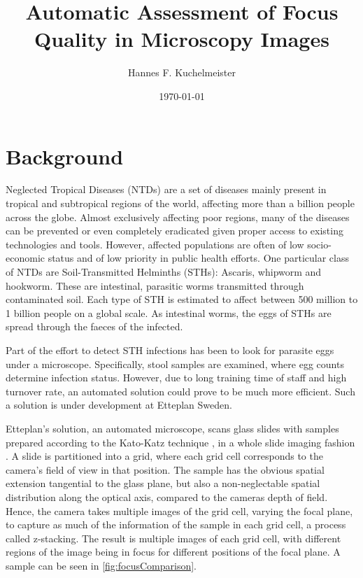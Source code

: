 \documentclass[a4paper,11pt]{article}
\title{Automatic Assessment of Focus Quality in Microscopy Images}
\author{Hannes F. Kuchelmeister}
\date{\today}
\begin{document}
\maketitle
\newpage



\section{Background}


Neglected Tropical Diseases (NTDs) are a set of diseases mainly present in tropical and subtropical regions of the world, affecting more than a billion people across the globe. Almost exclusively affecting poor regions, many of the diseases can be prevented or even completely eradicated given proper access to existing technologies and tools. However, affected populations are often of low socio-economic status and of low priority in public health efforts. One particular class of NTDs are Soil-Transmitted Helminths (STHs): Ascaris, whipworm and hookworm. These are intestinal, parasitic worms transmitted through contaminated soil. Each type of STH is estimated to affect between 500 million to 1 billion people on a global scale. As intestinal worms, the eggs of STHs are spread through the faeces of the infected. 

Part of the effort to detect STH infections has been to look for parasite eggs under a microscope. Specifically, stool samples are examined, where egg counts determine infection status. However, due to long training time of staff and high turnover rate, an automated solution could prove to be much more efficient. Such a solution is under development at Etteplan Sweden.

Etteplan’s solution, an automated microscope, scans glass slides with samples prepared according to the Kato-Katz technique \cite{worldhealthorganization1991basic}, in a whole slide imaging fashion \cite{hanna2019whole}. A slide is partitioned into a grid, where each grid cell corresponds to the camera’s field of view in that position. The sample has the obvious spatial extension tangential to the glass plane, but also a non-neglectable spatial distribution along the optical axis, compared to the cameras depth of field. Hence, the camera takes multiple images of the grid cell, varying the focal plane, to capture as much of the information of the sample in each grid cell, a process called z-stacking. The result is multiple images of each grid cell, with different regions of the image being in focus for different positions of the focal plane. A sample can be seen in \autoref{fig:focusComparison}.
\end{document}
